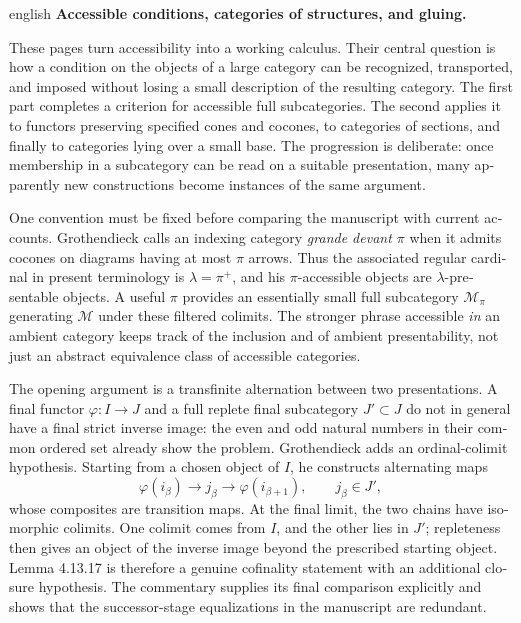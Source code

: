 \begin{otherlanguage}{english}
\begin{otherlanguage*}{english}
\noindent\textbf{Accessible conditions, categories of structures, and gluing.}

These pages turn accessibility into a working calculus. Their central question is how a condition on the objects of a large category can be recognized, transported, and imposed without losing a small description of the resulting category. The first part completes a criterion for accessible full subcategories. The second applies it to functors preserving specified cones and cocones, to categories of sections, and finally to categories lying over a small base. The progression is deliberate: once membership in a subcategory can be read on a suitable presentation, many apparently new constructions become instances of the same argument.

One convention must be fixed before comparing the manuscript with current accounts. Grothendieck calls an indexing category \emph{grande devant $\pi$} when it admits cocones on diagrams having at most $\pi$ arrows. Thus the associated regular cardinal in present terminology is $\lambda=\pi^+$, and his $\pi$-accessible objects are $\lambda$-presentable objects. A useful $\pi$ provides an essentially small full subcategory $\mathcal M_\pi$ generating $\mathcal M$ under these filtered colimits. The stronger phrase accessible \emph{in} an ambient category keeps track of the inclusion and of ambient presentability, not just an abstract equivalence class of accessible categories.

The opening argument is a transfinite alternation between two presentations. A final functor $\varphi:I\to J$ and a full replete final subcategory $J'\subset J$ do not in general have a final strict inverse image: the even and odd natural numbers in their common ordered set already show the problem. Grothendieck adds an ordinal-colimit hypothesis. Starting from a chosen object of $I$, he constructs alternating maps
\[
 \varphi(i_\beta)\longrightarrow j_\beta
 \longrightarrow\varphi(i_{\beta+1}),
 \qquad j_\beta\in J',
\]
whose composites are transition maps. At the final limit, the two chains have isomorphic colimits. One colimit comes from $I$, and the other lies in $J'$; repleteness then gives an object of the inverse image beyond the prescribed starting object. Lemma 4.13.17 is therefore a genuine cofinality statement with an additional closure hypothesis. The commentary supplies its final comparison explicitly and shows that the successor-stage equalizations in the manuscript are redundant.


\end{otherlanguage*}
\end{otherlanguage}
